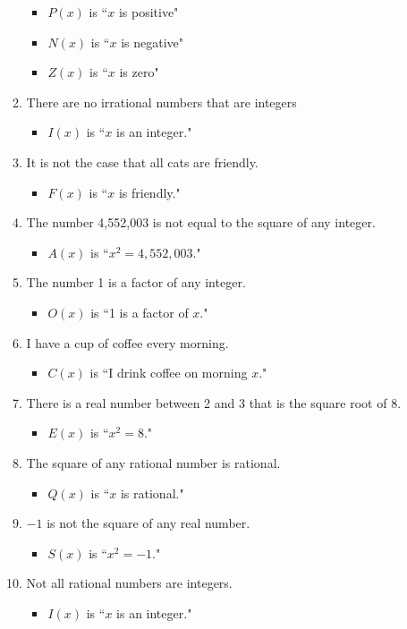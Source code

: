 \documentclass[10pt,letterpaper,unboxed,cm]{article}
\begin{document}
\begin{enumerate}
\begin{enumerate}
\begin{itemize}
\item
$P(x)$ is ``$x$ is positive"
\item
$N(x)$ is ``$x$ is negative"
\item
$Z(x)$ is ``$x$ is zero"
\end{itemize}
\item
There are no irrational numbers that are integers
\begin{itemize}
\item
$I(x)$ is ``$x$ is an integer."
\end{itemize}
\item
It is not the case that all cats are friendly.
\begin{itemize}
\item
$F(x)$ is ``$x$ is friendly."
\end{itemize}
\item
The number 4,552,003 is not equal to the square of any integer.
\begin{itemize}
\item
$A(x)$ is ``$x^2=4,552,003$."
\end{itemize}
\item
The number 1 is a factor of any integer.
\begin{itemize}
\item
$O(x)$ is ``1 is a factor of $x$."
\end{itemize}
\item
I have a cup of coffee every morning.
\begin{itemize}
\item
$C(x)$ is ``I drink coffee on morning $x$."
\end{itemize}
\item
There is a real number between 2 and 3 that is the square root of 8.
\begin{itemize}
\item
$E(x)$ is ``$x^2=8$."
\end{itemize}
\item
The square of any rational number is rational.
\begin{itemize}
\item
$Q(x)$ is ``$x$ is rational."
\end{itemize}
\item
$-1$ is not the square of any real number.
\begin{itemize}
\item
$S(x)$ is ``$x^2=-1$."
\end{itemize}
\item
Not all rational numbers are integers.
\begin{itemize}
\item
$I(x)$ is ``$x$ is an integer."
\end{itemize}
\end{enumerate}    
    

\end{enumerate}
\end{document}

